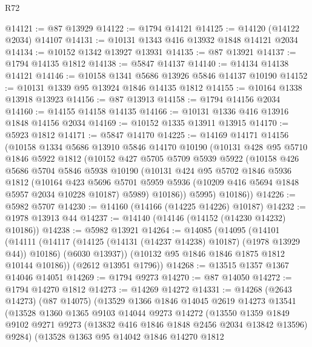 \begin{lexlean}{R72}
\begin{coremodule}
@14121 := @87 @13929
@14122 := @1794 @14121
@14125 := @14120 (@14122 @2034) @14107
@14131 := @10131 @1343 @416 @13932 @1848 @14121 @2034
@14134 := @10152 @1342 @13927 @13931
@14135 := @87 @13921
@14137 := @1794 @14135 @1812
@14138 := @5847 @14137
@14140 := @14134 @14138 @14121
@14146 := @10158 @1341 @5686 @13926 @5846 @14137 @10190
@14152 := @10131 @1339 @95 @13924 @1846 @14135 @1812
@14155 := @10164 @1338 @13918 @13923
@14156 := @87 @13913
@14158 := @1794 @14156 @2034
@14160 := @14155 @14158 @14135
@14166 := @10131 @1336 @416 @13916 @1848 @14156 @2034
@14169 := @10152 @1335 @13911 @13915
@14170 := @5923 @1812
@14171 := @5847 @14170
@14225 := @14169
    @14171
    @14156
    (@10158
      @1334
      @5686
      @13910
      @5846
      @14170
      @10190
      (@10131
        @428
        @95
        @5710
        @1846
        @5922
        @1812
        (@10152
          @427
          @5705
          @5709
          @5939
          @5922
          (@10158
            @426
            @5686
            @5704
            @5846
            @5938
            @10190
            (@10131
              @424
              @95
              @5702
              @1846
              @5936
              @1812
              (@10164
                @423
                @5696
                @5701
                @5959
                @5936
                (@10209 @416 @5694 @1848 @5957 @2034 @10228 @10187)
                @5989)
              @10186))
          @5995)
        @10186))
@14226 := @5982 @5707
@14230 := @14160 (@14166 (@14225 @14226) @10187)
@14232 := @1978 @13913 @44
@14237 := @14140 (@14146 (@14152 (@14230 @14232) @10186))
@14238 := @5982 @13921
@14264 := @14085
    (@14095
      (@14101
        (@14111
          (@14117 (@14125 (@14131 (@14237 @14238) @10187) (@1978 @13929 @44)) @10186)
          (@6030 @13937))
        (@10132 @95 @1846 @1846 @1875 @1812 @10144 @10186))
      (@2612 @13951 @1796))
@14268 := @13515 @1357 @1367 @14046 @14051
@14269 := @1794 @9273
@14270 := @87 @14050
@14272 := @1794 @14270 @1812
@14273 := @14269 @14272
@14331 := @14268
    (@2643 @14273)
    (@87 @14075)
    (@13529
      @1366
      @1846
      @14045
      @2619
      @14273
      @13541
      (@13528
        @1360
        @1365
        @9103
        @14044
        @9273
        @14272
        (@13550
          @1359
          @1849
          @9102
          @9271
          @9273
          (@13832 @416 @1846 @1848 @2456 @2034 @13842 @13596)
          @9284)
        (@13528
          @1363
          @95
          @14042
          @1846
          @14270
          @1812

\end{coremodule}
\end{lexlean}
